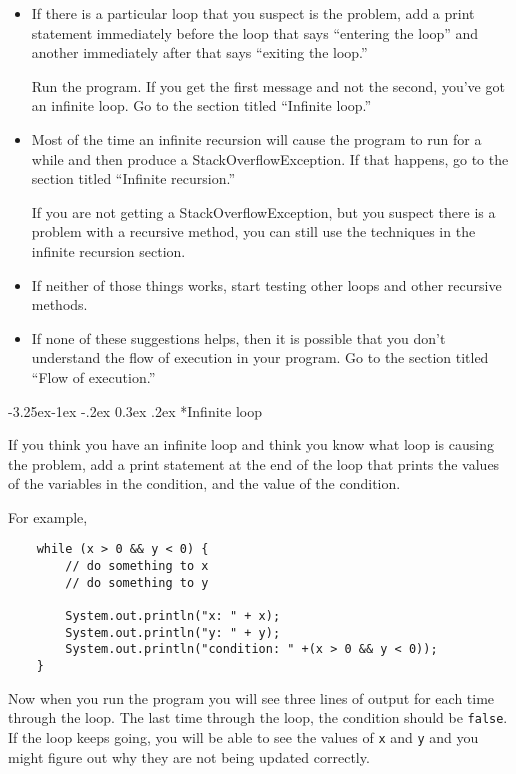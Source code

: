 \documentclass{book}
\makeatletter
\renewcommand\subsubsection{\@startsection {subsubsection}{3}{0mm}%
    {-3.25ex\@plus -1ex \@minus -.2ex}%
    {0.3ex \@plus .2ex}%
    {\normalfont\normalsize\bfseries}}
\makeatother
\begin{document}
\begin{itemize}

\item If there is a particular loop that you suspect is the
problem, add a print statement immediately before the loop
that says
``entering the loop'' and another immediately after that
says ``exiting the loop.''

Run the program.  If you get the first message and not
the second, you've got an infinite loop.  Go to the section
titled ``Infinite loop.''

\item Most of the time an infinite recursion will cause the program
to run for a while and then produce a StackOverflowException.
If that happens, go to the section
titled ``Infinite recursion.''

If you are not getting a StackOverflowException, but you suspect
there is a problem with a recursive method, you can still use
the techniques in the infinite recursion section.

\item If neither of those things works, start testing other
loops and other recursive methods.

\item If none of these suggestions helps, then it is possible that
you don't understand the flow of execution in your program.
Go to the section titled ``Flow of execution.''

\end{itemize}


\subsubsection*{Infinite loop}

If you think you have an infinite loop and think you know
what loop is causing the problem, add a print statement at
the end of the loop that prints the values of the variables in
the condition, and the value of the condition.

For example,

\begin{verbatim}
    while (x > 0 && y < 0) {
        // do something to x
        // do something to y

        System.out.println("x: " + x);
        System.out.println("y: " + y);
        System.out.println("condition: " +(x > 0 && y < 0));
    }
\end{verbatim}
%
Now when you run the program you will see three lines of output
for each time through the loop.  The last time through the
loop, the condition should be {\tt false}.  If the loop keeps
going, you will be able to see the values of {\tt x} and {\tt y}
and you might figure out why they are not being updated correctly.
\end{document}
